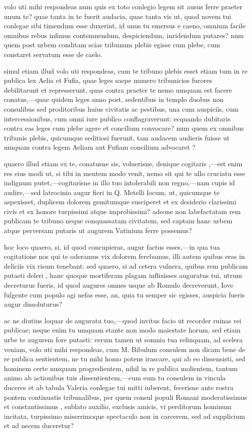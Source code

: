  volo uti mihi respondeas num quis ex toto conlegio legem sit ausus ferre praeter unum te? quae tanta in te fuerit audacia, quae tanta vis ut, quod novem tui conlegae sibi timendum esse duxerint, id unus tu emersus e caeno, omnium facile omnibus rebus infimus contemnendum, despiciendum, inridendum putares? num quem post urbem conditam scias tribunum plebis egisse cum plebe, cum constaret servatum esse de caelo.

 simul etiam illud volo uti respondeas, cum te tribuno plebis esset etiam tum in re publica lex Aelia et Fufia, quae leges saepe numero tribunicios furores debilitarunt et represserunt, quas contra praeter te nemo umquam est facere conatus,—quae quidem leges anno post, sedentibus in templo duobus non consulibus sed proditoribus huius civitatis ac pestibus, una cum auspiciis, cum intercessionibus, cum omni iure publico conflagraverunt: ecquando dubitaris contra eas leges cum plebe agere et concilium convocare? num quem ex omnibus tribunis plebis, quicumque seditiosi fuerunt, tam audacem audieris fuisse ut umquam contra legem Aeliam aut Fufiam concilium advocaret ?

 quaero illud etiam ex te, conatusne sis, voluerisne, denique cogitaris ,—est enim res eius modi ut, si tibi in mentem modo venit, nemo sit qui te ullo cruciatu esse indignum putet,—cogitarisne in illo tuo intolerabili non regno,—nam cupis id audire,—sed latrocinio augur fieri in Q. Metelli locum, ut, quicumque te aspexisset, duplicem dolorem gemitumque susciperet et ex desiderio clarissimi civis et ex honore turpissimi atque improbissimi? adeone non labefactatam rem publicam te tribuno neque conquassatam civitatem, sed captam hanc urbem atque perversam putaris ut augurem Vatinium ferre possemus?

 hoc loco quaero, si, id quod concupieras, augur factus esses,—in qua tua cogitatione nos qui te oderamus vix dolorem ferebamus, illi autem quibus eras in deliciis vix risum tenebant: sed quaero, si ad cetera vulnera, quibus rem publicam putasti deleri , hanc quoque mortiferam plagam inflixisses auguratus tui, utrum decreturus fueris, id quod augures omnes usque ab Romulo decreverunt, Iove fulgente cum populo agi nefas esse, an, quia tu semper sic egisses, auspicia fueris augur dissoluturus?

 ac ne diutius loquar de auguratu tuo,—quod invitus facio ut recorder ruinas rei publicae; neque enim tu umquam stante non modo maiestate horum, sed etiam urbe te augurem fore putasti: verum tamen ut somnia tua relinquam, ad scelera veniam, volo uti mihi respondeas, cum M. Bibulum consulem non dicam bene de re publica sentientem, ne tu mihi homo potens irascare, qui ab eo dissensisti, sed hominem certe nusquam progredientem, nihil in re publica molientem, tantum animo ab actionibus tuis dissentientem,—cum eum tu consulem in vincula duceres et ab tabula Valeria conlegae tui mitti iuberent, fecerisne ante rostra pontem continuatis tribunalibus, per quem consul populi Romani moderatissimus et constantissimus , sublato auxilio, exclusis amicis, vi perditorum hominum incitata, turpissimo miserrimoque spectaculo non in carcerem, sed ad supplicium et ad necem duceretur?

